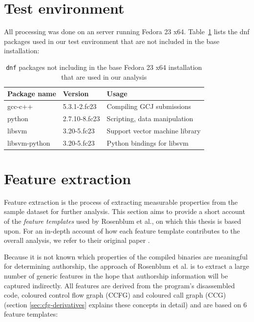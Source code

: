 \documentclass[a4paper,11pt]{kth-mag}
\begin{document}
\section{Test environment}
All processing was done on an server running Fedora 23 x64.
Table~\ref{tab:dnf-packages} lists the dnf packages used in our test
environment that are not included in the base installation:

\begin{table}[!htb]
    \centering
        \caption{\lstinline{dnf} packages not including in the base Fedora 23
        x64 installation that are used in our analysis}
        \begin{tabular}{ l l l }
        Package name & Version & Usage \\ \hline
        gcc-c++ & 5.3.1-2.fc23 & Compiling GCJ submissions \\
        python & 2.7.10-8.fc23 & Scripting, data manipulation \\
        libsvm & 3.20-5.fc23  & Support vector machine library \\
        libsvm-python & 3.20-5.fc23 & Python bindings for libsvm
        \end{tabular}
    \label{tab:dnf-packages}
\end{table}


\section{Feature extraction}
\label{sec:feature-extraction}
Feature extraction is the process of extracting measurable properties from the
sample dataset for further analysis. This section aims to provide a short
account of the \emph{feature templates} used by Rosenblum et al., on which this
thesis is based upon. For an in-depth account of how each feature template contributes
to the overall analysis, we refer to their original paper
\parencite{rosenblum2011wrote}.

Because it is not known which properties of the compiled binaries are
meaningful for determining authorship, the approach of Rosenblum et al. is to
extract a large number of generic features in the hope that authorship
information will be captured indirectly. All features are derived from the
program's disassembled code, coloured control flow graph (CCFG) and coloured
call graph (CCG) (section \ref{sec:cfg-derivatives} explains these concepts in
detail) and are based on 6 feature templates: 
\end{document}
